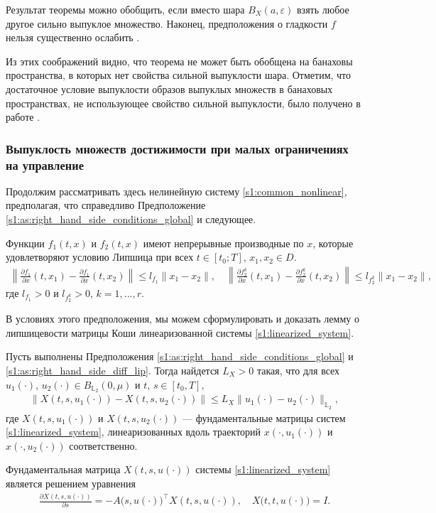 \documentclass[../main.tex]{subfiles}
\begin{document}
Результат теоремы можно обобщить, если вместо шара $B_X(a,\varepsilon) $ взять любое другое сильно выпуклое множество.
Наконец, предположения о гладкости $f$ нельзя существенно ослабить \cite{Polyak2001, Polyak2001ru}.
 
Из этих соображений видно, что теорема не может быть обобщена на банаховы пространства, в которых нет свойства сильной выпуклости шара.
Отметим, что достаточное условие выпуклости образов выпуклых множеств в банаховых пространствах, не использующее свойство сильной выпуклости, было получено в работе \cite{Ledyaev}. 
 
\subsubsection{Выпуклость множеств достижимости при малых ограничениях на управление}
 
Продолжим рассматривать здесь нелинейную систему \eqref{s1:common_nonlinear}, предполагая, что справедливо Предположение \ref{s1:as:right_hand_side_conditions_global} и следующее.
\begin{assumption}\label{s1:as:right_hand_side_diff_lip}
 Функции $f_1(t,x)$ и $f_2(t,x)$ имеют непрерывные производные по $x$, которые удовлетворяют условию Липшица при всех $t \in [t_0;T]$, $x_1, x_2 \in D$.
 \begin{gather*}
 \left\| \frac{\partial f_1}{\partial x}(t,x_1) - \frac{\partial f_1}{\partial x}(t,x_2) \right\| \leqslant l_{f_1} \| x_1 - x_2\|, \quad \left\| \frac{\partial f_2^k}{\partial x}(t,x_1) - \frac{\partial f_2^k}{\partial x}(t,x_2) \right\| \leqslant l_{f_2^k} \| x_1 - x_2\|,
 \end{gather*}
 где $l_{f_1} > 0$ и $l_{f_2^k} > 0$, $k = 1,...,r$.
\end{assumption}
 
В условиях этого предположения, мы можем сформулировать и доказать лемму о липшицевости матрицы Коши линеаризованной системы \eqref{s1:linearized_system}.
\begin{lemma}\label{s1:lem:lip_fundumental_matrix}
 Пусть выполнены Предположения \ref{s1:as:right_hand_side_conditions_global} и \ref{s1:as:right_hand_side_diff_lip}.
 Тогда найдется $L_X > 0 $ такая, что для всех $u_1(\cdot),\, u_2(\cdot) \in B_{\mathbb{L}_2}(0,\mu)$ и $t, \, s \in [t_0,T]$, 
 \begin{gather*}
 \Big\|X(t,s,u_1(\cdot)) - X(t,s,u_2(\cdot)) \Big\| \leqslant L_X \| u_1(\cdot) - u_2(\cdot) \|_{\mathbb{L}_2},
 \end{gather*}
 где $X(t,s,u_1(\cdot)) $ и $X(t,s,u_2(\cdot)) $ --- фундаментальные матрицы систем \eqref{s1:linearized_system}, линеаризованных вдоль траекторий $x(\cdot, u_1(\cdot)) $ и $x(\cdot, u_2(\cdot)) $ соответственно. 
\end{lemma}
\doc
Фундаментальная матрица $X(t,s,u(\cdot)) $ системы \eqref{s1:linearized_system} является решением уравнения
\begin{gather*}
 \frac{\partial X(t, s, u(\cdot))}{\partial s} = -A\big(s,u(\cdot)\big)^{\top} X(t, s, u(\cdot)), \quad X\big(t, t, u(\cdot)\big) = I.
\end{gather*}
 
\end{document}
